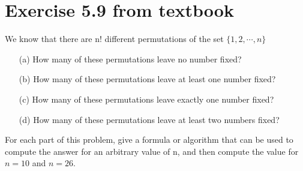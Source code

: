 \documentclass[12pt]{ut-thesis}
\theoremstyle{definition}
\begin{document}
	\section*{Exercise 5.9 from textbook}
	We know that there are n! different permutations of the set $\{1, 2, \cdots, n\}$
	\begin{itemize}
		\item[(a)] How many of these permutations leave no number fixed?
		\item[(b)] How many of these permutations leave at least one number fixed?
		\item[(c)] How many of these permutations leave exactly one number fixed?
		\item[(d)] How many of these permutations leave at least two numbers fixed?
	\end{itemize}
	For each part of this problem, give a formula or algorithm that can be used to
	compute the answer for an arbitrary value of n, and then compute the value for 
	$n=10$ and $n = 26$.
\end{document}
